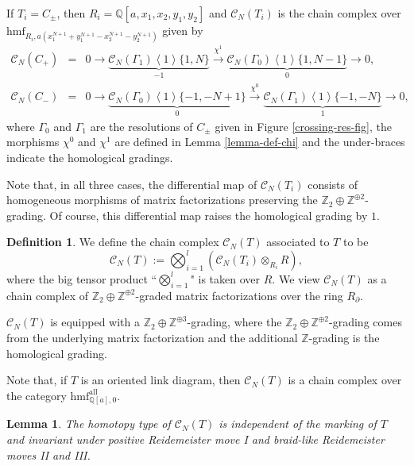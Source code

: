 \documentclass{amsart}
\theoremstyle{plain}
\newtheorem{lemma}[theorem]{Lemma}
\theoremstyle{definition}
\newtheorem{definition}[theorem]{Definition}
\theoremstyle{remark}
\numberwithin{equation}{section}
\begin{document}
If $T_i=C_\pm$, then $R_i = {\mathbb{Q}}[a,x_1,x_2,y_1,y_2]$ and ${\mathcal{C}}_N(T_i)$ is the chain complex over ${\mathrm{hmf}}_{R_i,a(x_1^{N+1}+y_1^{N+1}-x_2^{N+1}-y_2^{N+1})}$ given by
\begin{eqnarray}
\label{eq-def-chain-crossing+} {\mathcal{C}}_N(C_+) & = & 0 \rightarrow \underbrace{{\mathcal{C}}_N(\Gamma_1)\left\langle 1\right\rangle\{1,N\}}_{-1} \xrightarrow{\chi^1} \underbrace{{\mathcal{C}}_N(\Gamma_0)\left\langle 1\right\rangle\{1,N-1\}}_{0} \rightarrow 0, \\
\label{eq-def-chain-crossing-} {\mathcal{C}}_N(C_-) & = & 0 \rightarrow \underbrace{{\mathcal{C}}_N(\Gamma_0)\left\langle 1\right\rangle\{-1,-N+1\}}_{0} \xrightarrow{\chi^0} \underbrace{{\mathcal{C}}_N(\Gamma_1)\left\langle 1\right\rangle\{-1,-N\}}_{1} \rightarrow 0,
\end{eqnarray}
where $\Gamma_0$ and $\Gamma_1$ are the resolutions of $C_\pm$ given in Figure \ref{crossing-res-fig}, the morphisms $\chi^0$ and $\chi^1$ are defined in Lemma \ref{lemma-def-chi} and the under-braces indicate the homological gradings.

Note that, in all three cases, the differential map of ${\mathcal{C}}_N(T_i)$ consists of homogeneous morphisms of matrix factorizations preserving the ${\mathbb{Z}}_2 \oplus {\mathbb{Z}}^{\oplus 2}$-grading. Of course, this differential map raises the homological grading by $1$.

\begin{definition}\label{def-chain-tangle}
We define the chain complex ${\mathcal{C}}_N(T)$ associated to $T$ to be 
\[
{\mathcal{C}}_N(T) := \bigotimes_{i=1}^{l} ({\mathcal{C}}_N(T_i)\otimes_{R_i} R),
\]
where the big tensor product ``$\bigotimes_{i=1}^{l}$" is taken over $R$. We view ${\mathcal{C}}_N(T)$ as a chain complex of ${\mathbb{Z}}_2\oplus {\mathbb{Z}}^{\oplus 2}$-graded matrix factorizations over the ring $R_\partial$.

${\mathcal{C}}_N(T)$ is equipped with a ${\mathbb{Z}}_2\oplus {\mathbb{Z}}^{\oplus 3}$-grading, where the ${\mathbb{Z}}_2\oplus {\mathbb{Z}}^{\oplus 2}$-grading comes from the underlying matrix factorization and the additional ${\mathbb{Z}}$-grading is the homological grading.

Note that, if $T$ is an oriented link diagram, then ${\mathcal{C}}_N(T)$ is a chain complex over the category ${\mathrm{hmf}}^{\mathrm{all}}_{{\mathbb{Q}}[a],0}$.
\end{definition}

\begin{lemma}\cite[Lemma 4.5, and Propositions 5.5, 6.1, 7.5]{Wu-triple-trans}\label{lemma-chain-inv}
The homotopy type of ${\mathcal{C}}_N(T)$ is independent of the marking of $T$ and invariant under positive Reidemeister move I and braid-like Reidemeister moves II and III.
\end{lemma}
\end{document}
